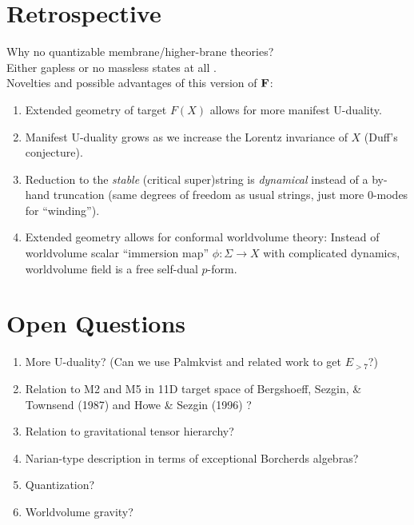 \documentclass[12pt]{article} %
\numberwithin{equation}{section}
\begin{document}
{\section{Retrospective}
Why no quantizable membrane/higher-brane theories?\\
Either gapless \cite{Polyakov:1986cs,Curtright:1982gt,Lovelace:1971fa} or no massless states at all \cite{deWit:1988ig,Mezincescu:1987kj}. \\
Novelties and possible advantages of this version of $\bf F$:
\begin{enumerate}
\item Extended geometry of target $F(X)$ allows for more manifest U-duality.
\item Manifest U-duality grows as we increase the Lorentz invariance of $X$ (Duff's conjecture).
\item Reduction to the {\em stable} (critical super)string is {\em dynamical} instead of a by-hand truncation (same degrees of freedom as usual strings, just more 0-modes for ``winding'').
\item Extended geometry allows for conformal worldvolume theory: Instead of worldvolume scalar ``immersion map'' $\phi : \Sigma \to X$ with complicated dynamics, worldvolume field is a free self-dual $p$-form.
\end{enumerate}


\section{Open Questions}
\begin{enumerate}
\item More U-duality? (Can we use Palmkvist \cite{Palmkvist:2015dea} and related work to get $E_{>7}$?)
\item Relation to 
M2 and M5 in 11D target space of
Bergshoeff, Sezgin, \& Townsend (1987) \cite{Bergshoeff:1987cm,Bergshoeff:1987qx} and
Howe \& Sezgin (1996) \cite{Howe:1996mx,Howe:1996yn}?\\
\item Relation to gravitational tensor hierarchy? 
\item Narian-type description in terms of exceptional Borcherds algebras? 
\item Quantization?
\item Worldvolume gravity? 
\end{enumerate}




}
\end{document}
